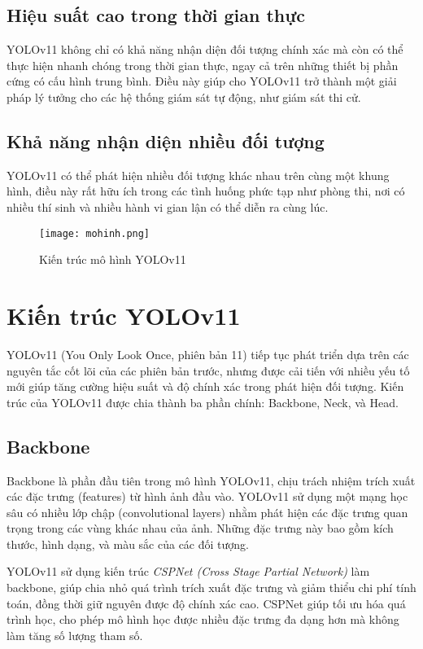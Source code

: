 \documentclass[conference]{IEEEtran}
\begin{document}
\subsection{Hiệu suất cao trong thời gian thực}
YOLOv11 không chỉ có khả năng nhận diện đối tượng chính xác mà còn có thể thực hiện nhanh chóng trong thời gian thực, ngay cả trên những thiết bị phần cứng có cấu hình trung bình. Điều này giúp cho YOLOv11 trở thành một giải pháp lý tưởng cho các hệ thống giám sát tự động, như giám sát thi cử.

\subsection{Khả năng nhận diện nhiều đối tượng}
YOLOv11 có thể phát hiện nhiều đối tượng khác nhau trên cùng một khung hình, điều này rất hữu ích trong các tình huống phức tạp như phòng thi, nơi có nhiều thí sinh và nhiều hành vi gian lận có thể diễn ra cùng lúc.

\begin{figure}[h]
    \centering
    \texttt{[image: mohinh.png]}
    \caption{Kiến trúc mô hình YOLOv11}
    \label{fig:yolov11_architecture}
\end{figure}

\section{Kiến trúc YOLOv11}

YOLOv11 (You Only Look Once, phiên bản 11) tiếp tục phát triển dựa trên các nguyên tắc cốt lõi của các phiên bản trước, nhưng được cải tiến với nhiều yếu tố mới giúp tăng cường hiệu suất và độ chính xác trong phát hiện đối tượng. Kiến trúc của YOLOv11 được chia thành ba phần chính: Backbone, Neck, và Head.

\subsection{Backbone}
Backbone là phần đầu tiên trong mô hình YOLOv11, chịu trách nhiệm trích xuất các đặc trưng (features) từ hình ảnh đầu vào. YOLOv11 sử dụng một mạng học sâu có nhiều lớp chập (convolutional layers) nhằm phát hiện các đặc trưng quan trọng trong các vùng khác nhau của ảnh. Những đặc trưng này bao gồm kích thước, hình dạng, và màu sắc của các đối tượng.

YOLOv11 sử dụng kiến trúc \textit{CSPNet (Cross Stage Partial Network)} làm backbone, giúp chia nhỏ quá trình trích xuất đặc trưng và giảm thiểu chi phí tính toán, đồng thời giữ nguyên được độ chính xác cao. CSPNet giúp tối ưu hóa quá trình học, cho phép mô hình học được nhiều đặc trưng đa dạng hơn mà không làm tăng số lượng tham số.
\end{document}

